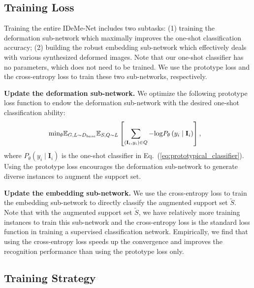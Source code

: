 \documentclass[10pt,letterpaper,twocolumn]{article}
\begin{document}
\subsection{Training Loss}
Training the entire IDeMe-Net includes two subtasks: (1) training
the deformation sub-network which maximally improves the one-shot
classification accuracy; (2) building the robust embedding sub-network
which effectively deals with various synthesized deformed images.
Note that our one-shot classifier has no parameters, which does not
need to be trained. We use the prototype loss and the cross-entropy
loss to train these two sub-networks, respectively.

\noindent \textbf{Update the deformation sub-network.} We optimize
the following prototype loss function to endow the deformation
sub-network with the desired one-shot classification ability:
\begin{equation}
\hspace{-0.3cm}\mathrm{min}_{\theta}\mathbb{E}_{G,L\sim D_{base}}\mathbb{E}_{S,Q\sim L}\left[\sum_{\left(\mathbf{I}_{i},y_{i}\right)\in Q}-\mathrm{log}P_{\theta}\left(y_{i}\mid\mathbf{I}_{i}\right)\right],\label{eq:loss_function}
\end{equation}
\noindent where $P_{\theta}\left(y_{i}\mid\mathbf{I}_{i}\right)$
is the one-shot classifier in Eq.~(\ref{eq:prototypical_classifier}).
Using the prototype loss encourages the deformation sub-network to generate diverse instances to augment the support set.

\noindent \textbf{Update the embedding sub-network. }We use the cross-entropy
loss to train the embedding sub-network to directly classify the augmented
support set $\tilde{S}$. Note that with the augmented support set
$\tilde{S}$, we have relatively more training instances to train this
sub-network and the cross-entropy loss is the standard loss function
in training a supervised classification network. Empirically, we find
that using the cross-entropy loss speeds up the convergence and improves
the recognition performance than using the prototype loss only.

\subsection{Training Strategy}
\end{document}
